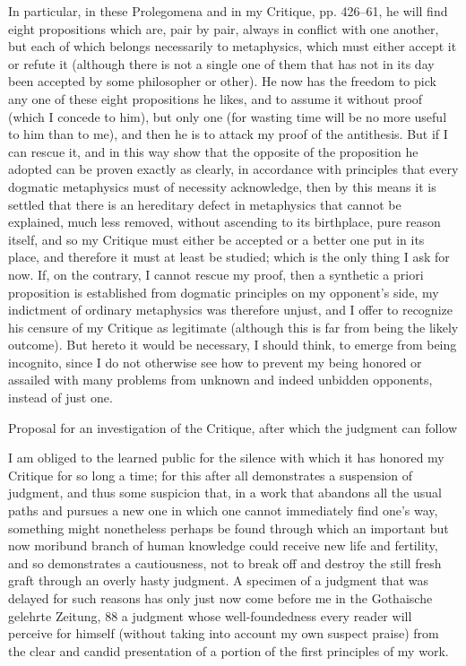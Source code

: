 In particular, in these Prolegomena and in my Critique, pp. 426–61, he
will ﬁnd eight propositions which are, pair by pair, always in conﬂict with
one another, but each of which belongs necessarily to metaphysics, which
must either accept it or refute it (although there is not a single one of
them that has not in its day been accepted by some philosopher or other).
He now has the freedom to pick any one of these eight propositions he
likes, and to assume it without proof (which I concede to him), but only
one (for wasting time will be no more useful to him than to me), and
then he is to attack my proof of the antithesis. But if I can rescue it,
and in this way show that the opposite of the proposition he adopted
can be proven exactly as clearly, in accordance with principles that every
dogmatic metaphysics must of necessity acknowledge, then by this means
it is settled that there is an hereditary defect in metaphysics that cannot
be explained, much less removed, without ascending to its birthplace,
pure reason itself, and so my Critique must either be accepted or a better
one put in its place, and therefore it must at least be studied; which is
the only thing I ask for now. If, on the contrary, I cannot rescue my
proof, then a synthetic a priori proposition is established from dogmatic
principles on my opponent’s side, my indictment of ordinary metaphysics
was therefore unjust, and I offer to recognize his censure of my Critique as
legitimate (although this is far from being the likely outcome). But hereto
it would be necessary, I should think, to emerge from being incognito, since
I do not otherwise see how to prevent my being honored or assailed with
many problems from unknown and indeed unbidden opponents, instead
of just one.

Proposal for an investigation of the Critique,
after which the judgment can follow

I am obliged to the learned public for the silence with which it has
honored my Critique for so long a time; for this after all demonstrates
a suspension of judgment, and thus some suspicion that, in a work that
abandons all the usual paths and pursues a new one in which one cannot
immediately ﬁnd one’s way, something might nonetheless perhaps be
found through which an important but now moribund branch of human
knowledge could receive new life and fertility, and so demonstrates a
cautiousness, not to break off and destroy the still fresh graft through an
overly hasty judgment. A specimen of a judgment that was delayed for
such reasons has only just now come before me in the Gothaische gelehrte
Zeitung, 88 a judgment whose well-foundedness every reader will perceive
for himself (without taking into account my own suspect praise) from
the clear and candid presentation of a portion of the ﬁrst principles of
my work.

